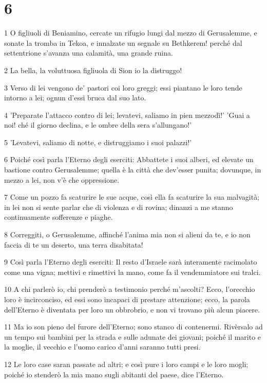 \chapter{6}

\par 1 O figliuoli di Beniamino, cercate un rifugio lungi dal mezzo di Gerusalemme, e sonate la tromba in Tekoa, e innalzate un segnale su Bethkerem! perché dal settentrione s'avanza una calamità, una grande ruina.
\par 2 La bella, la voluttuosa figliuola di Sion io la distruggo!
\par 3 Verso di lei vengono de' pastori coi loro greggi; essi piantano le loro tende intorno a lei; ognun d'essi bruca dal suo lato.
\par 4 'Preparate l'attacco contro di lei; levatevi, saliamo in pien mezzodì!' 'Guai a noi! ché il giorno declina, e le ombre della sera s'allungano!'
\par 5 'Levatevi, saliamo di notte, e distruggiamo i suoi palazzi!'
\par 6 Poiché così parla l'Eterno degli eserciti: Abbattete i suoi alberi, ed elevate un bastione contro Gerusalemme; quella è la città che dev'esser punita; dovunque, in mezzo a lei, non v'è che oppressione.
\par 7 Come un pozzo fa scaturire le sue acque, così ella fa scaturire la sua malvagità; in lei non si sente parlar che di violenza e di rovina; dinanzi a me stanno continuamente sofferenze e piaghe.
\par 8 Correggiti, o Gerusalemme, affinché l'anima mia non si alieni da te, e io non faccia di te un deserto, una terra disabitata!
\par 9 Così parla l'Eterno degli eserciti: Il resto d'Israele sarà interamente racimolato come una vigna; mettivi e rimettivi la mano, come fa il vendemmiatore sui tralci.
\par 10 A chi parlerò io, chi prenderò a testimonio perché m'ascolti? Ecco, l'orecchio loro è incirconciso, ed essi sono incapaci di prestare attenzione; ecco, la parola dell'Eterno è diventata per loro un obbrobrio, e non vi trovano più alcun piacere.
\par 11 Ma io son pieno del furore dell'Eterno; sono stanco di contenermi. Rivèrsalo ad un tempo sui bambini per la strada e sulle adunate dei giovani; poiché il marito e la moglie, il vecchio e l'uomo carico d'anni saranno tutti presi.
\par 12 Le loro case saran passate ad altri; e così pure i loro campi e le loro mogli; poiché io stenderò la mia mano sugli abitanti del paese, dice l'Eterno.
